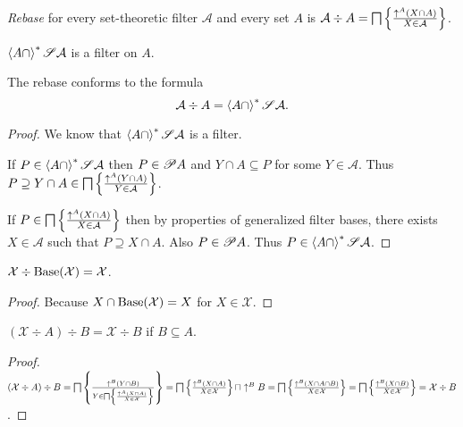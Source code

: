 \begin{defn}
\emph{Rebase} for every set-theoretic filter $\mathcal{A}$
and every set $A$ is
  $\mathcal{A} \div A = \bigsqcap \left\{ \frac{ \uparrow^A  (X \cap A) }{ X \in \mathcal{A} }\right\}$.
\end{defn}

\begin{obvious}
$\left\langle A\cap\right\rangle ^{\ast}\mathscr{S}\mathcal{A}$ is a filter on $A$.
\end{obvious}


\begin{prop}
The rebase conforms to the formula
\[
\mathcal{A}\div A=\left\langle A\cap\right\rangle ^{\ast}\mathscr{S}\mathcal{A}.
\]
\end{prop}

\begin{proof}
We know that $\left\langle A\cap\right\rangle ^{\ast}\mathscr{S}\mathcal{A}$ is a
filter.

If $P \in \left\langle A\cap\right\rangle ^{\ast}\mathscr{S}\mathcal{A}$ then $P \in \mathscr{P} A$ and $Y\cap A
\subseteq P$ for some $Y \in \mathcal{A}$. Thus $P \supseteq Y \cap A \in
\bigsqcap \left\{ \frac{ \uparrow^A  (Y \cap A) }{ Y \in \mathcal{A} }\right\}$.

If $P \in \bigsqcap \left\{ \frac{ \uparrow^A  (X \cap A) }{
X \in \mathcal{A} }\right\}$ then by properties of generalized filter bases,
there exists $X \in \mathcal{A}$ such that $P \supseteq X \cap A$. Also $P \in
\mathscr{P} A$. Thus $P \in \left\langle A\cap\right\rangle ^{\ast}\mathscr{S}\mathcal{A}$.
\end{proof}

\begin{prop}\label{rebase-itself}
$\mathcal{X}\div\operatorname{Base}(\mathcal{X}) = \mathcal{X}$.
\end{prop}

\begin{proof}
Because $X\cap\operatorname{Base}(\mathcal{X}) = X$ for
$X\in\mathcal{X}$.
\end{proof}

\begin{prop}\label{double-rebase}
  $(\mathcal{X} \div A) \div B = \mathcal{X} \div B$ if $B \subseteq A$.
\end{prop}

\begin{proof}
  $(\mathcal{X} \div A) \div B = \bigsqcap \left\{ \frac{ \uparrow^B  (Y \cap B)
  }{ Y \in \bigsqcap \left\{ \frac{ \uparrow^A  (X \cap A)}{X \in \mathcal{X} }\right\} \mathcal{} }\right\} =
  \bigsqcap \left\{ \frac{ \uparrow^B  (X \cap A) }{ X \in
  \mathcal{X} }\right\} \sqcap \uparrow^B B =
  \bigsqcap \left\{ \frac{ \uparrow^B  (X
  \cap A \cap B) }{ X \in \mathcal{X} }\right\} =
  \bigsqcap \left\{ \frac{ \uparrow^B  (X
  \cap B) }{ X \in \mathcal{X} }\right\} =
  \mathcal{X} \div B$.
\end{proof}

